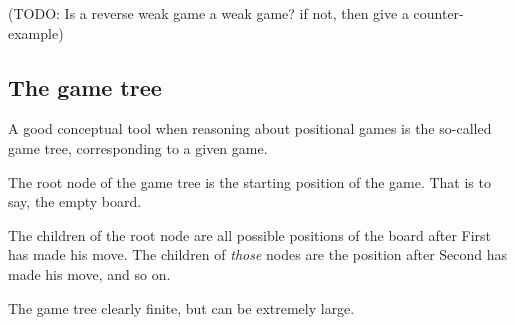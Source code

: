 (TODO: Is a reverse weak game a weak game? if not, then give a counter-example)


\subsection{The game tree}

A good conceptual tool when reasoning about positional games is the so-called game tree, corresponding to a given game.

The root node of the game tree is the starting position of the game.
That is to say, the empty board.

The children of the root node are all possible positions of the board after First has made his move.
The children of \emph{those} nodes are the position after Second has made his move, and so on.

The game tree clearly finite, but can be extremely large.
